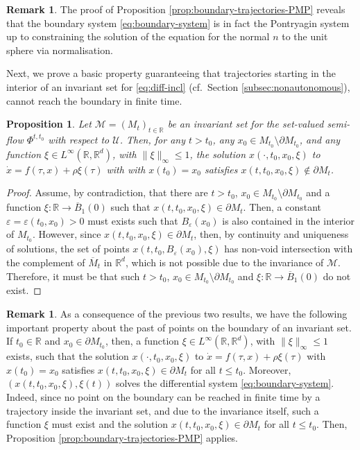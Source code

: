 \documentclass[reqno]{amsart}
\newtheorem{prop}[thm]{Proposition}
\theoremstyle{definition}
\newtheorem{rmk}[thm]{Remark}
\numberwithin{equation}{section}
\newcommand{\R}{\mathbb{R}}
\newcommand{\M}{\mathscr{M}}
\newcommand{\U}{\mathcal{U}}
\newcommand{\ep}{\varepsilon}
\begin{document}
\begin{rmk}
    The proof of Proposition \ref{prop:boundary-trajectories-PMP} reveals  that the boundary system \eqref{eq:boundary-system} is in fact the Pontryagin system up to constraining the solution of the equation for the normal $n$ to the unit sphere via normalisation.
\end{rmk}


Next, we prove a basic property guaranteeing that trajectories starting in the interior of an invariant set for \eqref{eq:diff-incl} (cf.~Section \ref{subsec:nonautonomous}), cannot reach the boundary in finite time.

\begin{prop}\label{prop:trajectories-on-boundary}
    Let $\M=(M_t)_{t\in\R}$ be an invariant set for the set-valued semi-flow $\Phi^{t,t_0}$ with respect to $\U$. Then, for any $t>t_0$, any $x_0\in M_{t_0}\setminus\partial M_{t_0}$, and any function $\xi\in L^\infty(\R,\R^d)$, with
    $\|\xi\|_\infty\le 1$, the solution $x(\cdot,t_0,x_0,\xi)$ to $\dot x=f(\tau,x)+\rho \xi(\tau)$ with with $x(t_0)=x_0$ satisfies $x(t,t_0,x_0,\xi)\notin\partial M_t$. 
\end{prop}
\begin{proof}
Assume, by contradiction, that there are $t>t_0$, $x_0\in M_{t_0}\setminus \partial M_{t_0}$ and a function $\xi:\R\to \overline B_1(0)$ such that $x(t,t_0,x_0,\xi)\in\partial M_t$. Then, a constant $\ep=\ep(t_0,x_0)>0$ must exists such that $B_\ep(x_0)$ is also contained in the interior of $M_{t_0}$. 
However, since $x(t,t_0,x_0,\xi)\in\partial M_t$, then, by continuity and uniqueness of solutions, the set of points $x(t,t_0,B_\ep(x_0),\xi)$ has non-void intersection with the complement of $\overline M_t$ in $\R^d$, which is not possible due to the invariance of $\M$. Therefore, it must be that such $t>t_0$, $x_0\in M_{t_0}\setminus \partial M_{t_0}$ and $\xi:\R\to \overline B_1(0)$ do not exist.
\end{proof}

\begin{rmk}\label{rmk:backward-time-PMP}
As a consequence of the previous two results, we have the following important property about the past of points on the boundary of an invariant set. If $t_0\in\R$ and $x_0\in\partial M_{t_0}$, then, a function $\xi\in L^\infty(\R,\R^d)$, with   $\|\xi\|_\infty\le 1$ exists, such that the solution $x(\cdot,t_0,x_0,\xi)$ to $\dot x=f(\tau,x)+\rho \xi(\tau)$ with $x(t_0)=x_0$ satisfies $x(t,t_0,x_0,\xi)\in\partial M_t$ for all $t\le t_0$. Moreover, $(x(t,t_0,x_0,\xi),\xi(t))$ solves the differential system \eqref{eq:boundary-system}.  Indeed, since no point on the boundary can be reached in finite time by a trajectory inside the invariant set, and due to the invariance itself, such a function $\xi$ must exist and the solution $x(t,t_0,x_0,\xi)\in\partial M_t$ for all $t\le t_0$. Then, Proposition \ref{prop:boundary-trajectories-PMP} applies.
\end{rmk}
\end{document}
